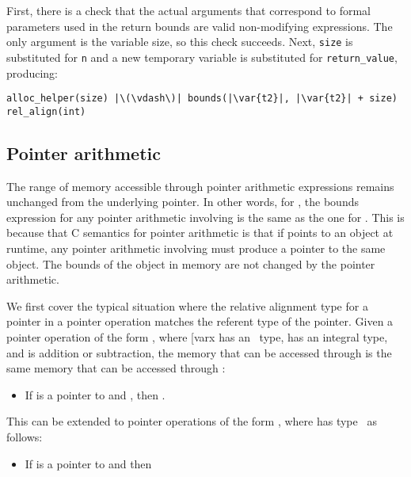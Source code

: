First, there is a check that the actual arguments that correspond to
formal parameters used in the return bounds are valid non-modifying
expressions. The only argument is the variable size, so this check
succeeds. Next, \lstinline|size| is substituted for \lstinline|n| and
a new temporary variable  is substituted for \lstinline|return_value|, producing:
\begin{lstlisting}[escapechar=\|]
   alloc_helper(size) |\(\vdash\)| bounds(|\var{t2}|, |\var{t2}| + size) rel_align(int)
\end{lstlisting}

\subsection{Pointer arithmetic}

The range of memory accessible through pointer arithmetic expressions
remains unchanged from the underlying pointer. In other words, for
, the bounds expression for any
pointer arithmetic involving  is the same as the one for
. This is because that C semantics for pointer arithmetic is
that if  points to an object at runtime, any pointer arithmetic
involving  must produce a pointer to the same object. The bounds
of the object in memory are not changed by the pointer arithmetic.

We first cover the typical situation where the relative alignment type
for a pointer in a pointer operation matches the referent type of the
pointer. Given a pointer operation of the form , where [var{x}
has an \arrayptr\ type,  has an integral type, and
 is addition or subtraction, the memory that can be accessed
through  is the same memory that can be accessed through
:

\begin{itemize}
\item
  If  is a pointer to  and 
  ,
  then .
\end{itemize}

This can be extended to pointer operations of the form ,
where  has type
\arrayptrT\ as
follows:

\begin{itemize}
\item
  If  is a pointer to  and 
  then 
\end{itemize}

